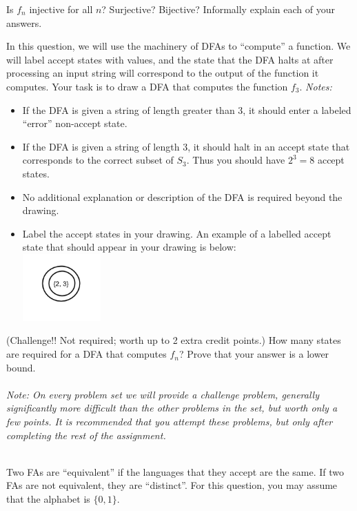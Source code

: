\documentclass[solution, letterpaper]{cs121}
\begin{document}
\subproblem Is $f_n$ injective for all $n$? Surjective? Bijective? Informally explain each of your answers.

\subproblem In this question, we will use the machinery of DFAs to ``compute'' a function. We will label accept states with values, and the state that the DFA halts at after processing an input string will correspond to the output of the function it computes. Your task is to draw a DFA that computes the function $f_3$. \textit{Notes: } 
\begin{itemize}
\item If the DFA is given a string of length greater than 3, it should enter a labeled ``error'' non-accept state. 
\item If the DFA is given a string of length 3, it should halt in an accept state that corresponds to the correct subset of $S_3$.  Thus you should have $2^3 = 8$ accept states. 
\item No additional explanation or description of the DFA is required beyond the drawing. 
\item Label the accept states in your drawing. An example of a labelled accept state that should appear in your drawing is below:\\
\includegraphics[width=3cm]{1-1ex.png}
\end{itemize}
\subproblem (Challenge!! Not required; worth up to 2 extra credit points.) How many states are required for a DFA that computes $f_n$? Prove that your answer is a lower bound.\\\\
\textit{Note: On every problem set we will provide a challenge problem, generally significantly more difficult than the other problems in the set, but worth only a few points. It is recommended that you attempt these problems, but only after completing the rest of the assignment.} 
\\\\
\pagebreak

Two FAs are ``equivalent'' if the languages that they accept are the same. If two FAs are not equivalent, they are ``distinct''. For this question, you may assume that the alphabet is $\{0, 1\}$.
\end{document}
